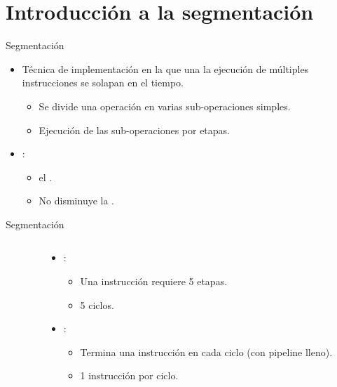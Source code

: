 \section{Introducción a la segmentación}

\begin{frame}[t]{Segmentación}
\begin{itemize}
  \item Técnica de implementación en la que una la ejecución de múltiples 
        instrucciones se solapan en el tiempo.
    \begin{itemize}
      \item Se divide una operación  en varias 
            sub-operaciones simples.
      \item Ejecución de las sub-operaciones por etapas.
    \end{itemize}
  \item {}:
    \begin{itemize}
      \item {} el .
      \item \alert{No disminuye} la .
    \end{itemize}
\end{itemize}
\end{frame}

\begin{frame}[t,fragile]{Segmentación}
\begin{columns}[T]
\begin{column}{0.6\textwidth}

\end{column}

\pause
\begin{column}[t]{.4\textwidth}
\begin{itemize}
  \item {}:
    \begin{itemize}
      \item Una instrucción requiere 5 etapas.
      \item 5 ciclos.
    \end{itemize}
  \item {}:
    \begin{itemize}
      \item Termina una instrucción en cada ciclo (con pipeline lleno).
      \item 1 instrucción por ciclo.
    \end{itemize}
\end{itemize}
\end{column}
\end{columns}
\end{frame}


